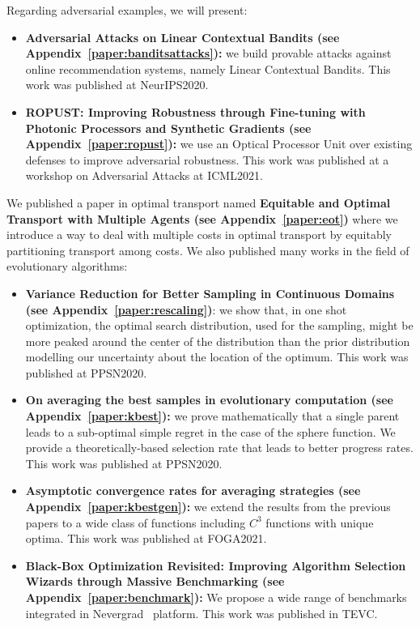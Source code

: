 Regarding adversarial examples, we will present:
\begin{itemize}
    \item \textbf{Adversarial Attacks on Linear Contextual Bandits (see Appendix~\ref{paper:banditsattacks}):} we build provable attacks against online recommendation systems, namely Linear Contextual Bandits. This work was published at NeurIPS2020.
    \item \textbf{ROPUST: Improving Robustness through Fine-tuning with Photonic Processors and Synthetic Gradients (see Appendix~\ref{paper:ropust}):} we use an Optical Processor Unit over existing defenses to improve adversarial robustness. This work was published at a workshop on Adversarial Attacks at ICML2021.
\end{itemize}
We  published a paper in optimal transport named \textbf{Equitable and Optimal Transport with Multiple Agents (see Appendix~\ref{paper:eot})} where we introduce a way to deal with multiple costs in optimal transport by equitably partitioning transport among costs.
We also published many works in the field of evolutionary algorithms:
\begin{itemize}

    \item \textbf{Variance Reduction for Better Sampling in Continuous Domains (see Appendix~\ref{paper:rescaling})}: we show that, in one shot optimization, the optimal search distribution, used for the sampling, might be more peaked around the center of the distribution than the prior distribution modelling our uncertainty about the location of the optimum. This work was published at PPSN2020.
    \item \textbf{On averaging the best samples in evolutionary computation (see Appendix~\ref{paper:kbest}):}  we prove mathematically that a single parent leads to a sub-optimal simple regret in the case of the sphere function. We provide a theoretically-based selection rate that leads to better progress rates. This work was published at PPSN2020.
    \item \textbf{Asymptotic convergence rates for averaging strategies (see Appendix~\ref{paper:kbestgen}):} we extend the results from the previous papers to a wide class of functions including $C^3$ functions with unique optima. This work was published at FOGA2021.
    \item  \textbf{Black-Box Optimization Revisited: Improving Algorithm Selection Wizards through Massive Benchmarking (see Appendix~\ref{paper:benchmark}):} We propose a wide range of benchmarks integrated in Nevergrad~\citep{nevergrad} platform. This work was published in TEVC.
    
\end{itemize}

